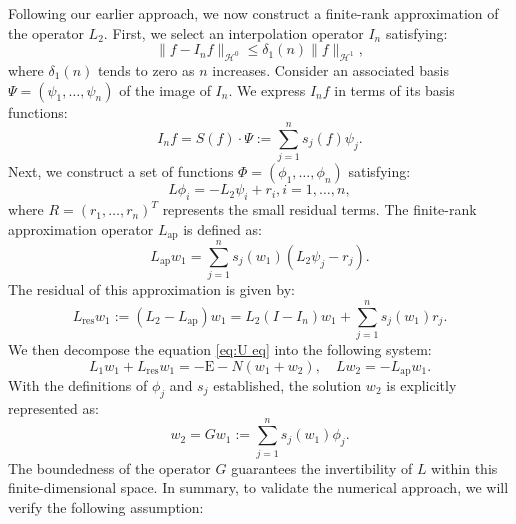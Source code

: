 \documentclass[11pt,a4paper]{article}
\numberwithin{equation}{section}
\newcommand{\Epsilon}{\mathrm{E}}
\newcommand{\assign}{:=}
\newcommand{\cdummy}{\cdot}
\newcommand{\tmop}[1]{\ensuremath{\operatorname{#1}}}
\begin{document}
Following our earlier approach, we now construct a finite-rank approximation
of the operator $L_2$. First, we select an interpolation operator $I_n$
satisfying:
\[ \| f - I_n f \|_{\mathcal{H}^0} \leqslant \delta_1 (n) \| f
   \|_{\mathcal{H}^1}, \]
where $\delta_1 (n)$ tends to zero as $n$ increases.  Consider an associated basis $\Psi = (\psi_1,
\ldots, \psi_n)$ of the image of $I_n$. We express $I_n f$ in terms of its basis functions:
\[ I_n f = S (f) \cdummy \Psi \assign \sum_{j = 1}^n s_j (f) \psi_j . \]
 Next, we construct a set of
functions $\Phi = (\phi_1, \ldots, \phi_n)$ satisfying:
\begin{equation}
  L \phi_i = -L_2 \psi_i + r_i, i = 1, \ldots, n, \label{eq:gk method1}
\end{equation}
where $R = (r_1, \ldots, r_n)^T$ represents the small residual terms. The
finite-rank approximation operator $ L_{\tmop{ap}}$ is defined as:
\begin{equation*}
  L_{\tmop{ap}} w_1 = \sum_{j = 1}^n s_j (w_1) (L_2 \psi_j - r_j).
  \label{eq:Lapn tilde def}
\end{equation*}
The residual of this approximation is given by:
\begin{equation}
    \label{def lresn}
L_{\tmop{res}} w_1 \assign (L_2- L_{\tmop{ap}})w_1= L_2 (I - I_n) w_1 + \sum_{j = 1}^n s_j (w_1) r_j .
\end{equation}
We then decompose the equation \eqref{eq:U eq} into the following system:
\begin{equation}
  L_1 w_1 + L_{\tmop{res}} w_1 = -\Epsilon - N (w_1+w_2), \quad Lw_2 = 
  - L_{\tmop{ap}} w_1 . \label{eq:eigen_num}
\end{equation}
With the definitions of $\phi_j$ and $s_j$ established, the solution $w_2$ is
explicitly represented as:
\begin{equation*}
  w_2 = G w_1 \assign  \sum_{j = 1}^n s_j (w_1) \phi_j.\label{eq:u2 def}
\end{equation*}
The boundedness of the operator $G$ guarantees the invertibility of $L$
within this finite-dimensional space. In summary, to validate the numerical
approach, we will verify the following assumption:
\end{document}
